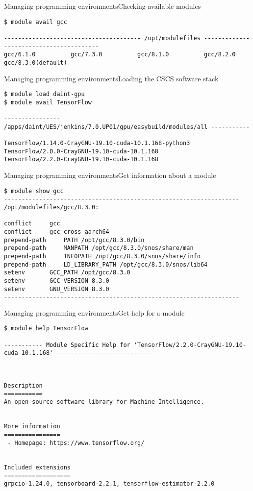 \begin{frame}[fragile]{Managing programming environments}{Checking available modules}
  \begin{lstlisting}[style=console]
$ module avail gcc

--------------------------------------- /opt/modulefiles ----------------------------------------
gcc/6.1.0          gcc/7.3.0          gcc/8.1.0          gcc/8.2.0          gcc/8.3.0(default)
  \end{lstlisting}
\end{frame}


\begin{frame}[fragile]{Managing programming environments}{Loading the CSCS software stack}
  \begin{lstlisting}[style=console]
$ module load daint-gpu
$ module avail TensorFlow

---------------- /apps/daint/UES/jenkins/7.0.UP01/gpu/easybuild/modules/all -----------------
TensorFlow/1.14.0-CrayGNU-19.10-cuda-10.1.168-python3
TensorFlow/2.0.0-CrayGNU-19.10-cuda-10.1.168
TensorFlow/2.2.0-CrayGNU-19.10-cuda-10.1.168

  \end{lstlisting}
\end{frame}

\begin{frame}[fragile]{Managing programming environments}{Get information about a module}
  \begin{lstlisting}[style=console]
$ module show gcc
-------------------------------------------------------------------
/opt/modulefiles/gcc/8.3.0:

conflict	 gcc
conflict	 gcc-cross-aarch64
prepend-path	 PATH /opt/gcc/8.3.0/bin
prepend-path	 MANPATH /opt/gcc/8.3.0/snos/share/man
prepend-path	 INFOPATH /opt/gcc/8.3.0/snos/share/info
prepend-path	 LD_LIBRARY_PATH /opt/gcc/8.3.0/snos/lib64
setenv		 GCC_PATH /opt/gcc/8.3.0
setenv		 GCC_VERSION 8.3.0
setenv		 GNU_VERSION 8.3.0
-------------------------------------------------------------------
  \end{lstlisting}
\end{frame}


\begin{frame}[fragile]{Managing programming environments}{Get help for a module}
  \begin{lstlisting}[style=console]
$ module help TensorFlow

----------- Module Specific Help for 'TensorFlow/2.2.0-CrayGNU-19.10-cuda-10.1.168' ---------------------------



Description
===========
An open-source software library for Machine Intelligence.


More information
================
 - Homepage: https://www.tensorflow.org/


Included extensions
===================
grpcio-1.24.0, tensorboard-2.2.1, tensorflow-estimator-2.2.0
  \end{lstlisting}
\end{frame}
